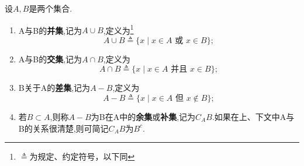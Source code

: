 \begin{mydef*}{}
	
	设$A,B$是两个集合.
	
	
	\begin{enumerate}[label=\arabic{enumi})]
		\item
		A与B的\textbf{并集},记为\(A\cup B\),定义为\footnote[1]{$\triangleq$为规定、约定符号，以下同} \[A\cup B\mathrel{\triangleq}\{x\mid x\in A\text{ 或 }x\in B\};\]
		\item
		A与B的\textbf{交集},记为\(A\cap B\),定义为 \[A\cap B\mathrel{\triangleq}\{x\mid x\in A\text{ 并且 }x\in B\};\]
		\item
		B关于A的\textbf{差集},记为\(A-B\),定义为 \[A-B\mathrel{\triangleq}\{x\mid x\in A\text{ 但 }x\notin B\};\]
		\item
		若\(B\subset A\),则称\(A-B\)为B在A中的\textbf{余集}或\textbf{补集},记为\(C_A B\).如果在上、下文中A与B的关系很清楚,则可简记\(C_A B\)为\(B^c\).
	\end{enumerate}
	
	
\end{mydef*}

